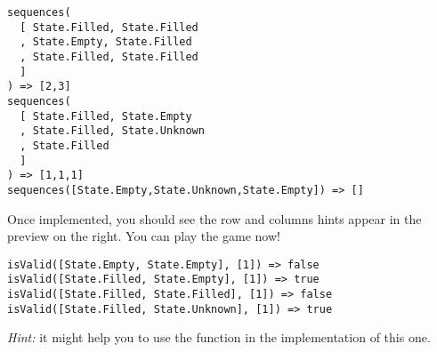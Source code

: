 \begin{verbatim}
sequences(
  [ State.Filled, State.Filled
  , State.Empty, State.Filled
  , State.Filled, State.Filled
  ]
) => [2,3]
sequences(
  [ State.Filled, State.Empty
  , State.Filled, State.Unknown
  , State.Filled
  ]
) => [1,1,1]
sequences([State.Empty,State.Unknown,State.Empty]) => []
\end{verbatim}
Once implemented, you should see the row and columns hints appear in the preview on the right. You can play the game now!

\begin{verbatim}
isValid([State.Empty, State.Empty], [1]) => false 
isValid([State.Filled, State.Empty], [1]) => true
isValid([State.Filled, State.Filled], [1]) => false
isValid([State.Filled, State.Unknown], [1]) => true
\end{verbatim}
\emph{Hint:} it might help you to use the  function in the implementation of this one.
